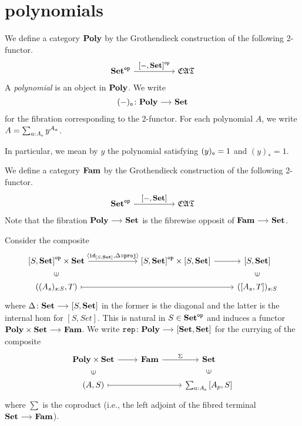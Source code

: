 \documentclass[a4paper,dvipsnames, 11pt]{amsart} %
\begin{document}
\section{polynomials}
\begin{definition}
	We define a category $\mathbf{Poly}$ by the Grothendieck construction of the following 2-functor.
	\[
		\Set^\op
		\arr"\left[-,\Set\right]^\op"[][5]
		\CATbi
	\]
	A \emph{polynomial} is an object in $\mathbf{Poly}$.
	We write
	\[
		(-)_\ob\colon\Poly\arr\Set
	\]
	for the fibration corresponding to the 2-functor.
	For each polynomial $A$,
	we write $A=\sum_{a: A_{\mathtt{o}}}y^{A_a}$.

	In particular, we mean by $y$ the polynomial satisfying
	$(y)_{\mathtt{o}}=1$ and $(y)_*=1$.
\end{definition}
\begin{definition}
	We define a category $\mathbf{Fam}$ by the Grothendieck construction of the following 2-functor.
	\[
		\Set^\op
		\arr"\left[-,\Set\right]"[][5]
		\CATbi
	\]
	Note that the fibration $\Poly\arr\Set$ is the fibrewise opposit of $\Fam\arr\Set$.
\end{definition}
\begin{definition}
	Consider the composite
	\[
		\begin{tikzcd}[row sep=5mm]
			\left[S,\Set\right]^\op\times\Set
			\ar[rr,"{\langle\id_{[S,\Set]},\Delta\circ\proj\rangle}"]
				&\ &
				\left[S,\Set\right]^\op\times\left[S,\Set\right]
				\ar[r]
					&
					\left[S,\Set\right]
			\\
			((A_s)_{s\tcolon S}, T)
			\ar[rrr,mapsto]
			\ar[u,"\in"marking,phantom]
				&\ &
					&
					(\left[A_s,T\right])_{s\tcolon S}
					\ar[u,"\in"marking,phantom]
		\end{tikzcd}
	\]
	where $\Delta\colon\Set\arr\left[S,\Set\right]$ in the former is the diagonal and
	the latter is the internal hom for $[S,Set]$.
	This is natural in $S\in\mathbf{Set}^{\mathtt{op}}$ and induces a functor
	$\Poly\times\Set\arr\Fam$.
	We write $\rep\colon\Poly\arr\left[\Set,\Set\right]$ for the currying of the composite
	\[
		\begin{tikzcd}[row sep=5mm]
			\Poly\times\Set
			\ar[r]
				&
				\Fam
				\ar[r,"\Sigma"]
					&
					\Set
			\\
			(A,S)
			\ar[rr,mapsto]
			\ar[u,"\in"marking,phantom]
				&
					&
					\sum_{a\tcolon A_\ob}\left[A_p,S\right]
					\ar[u,"\in"marking,phantom]
		\end{tikzcd}
	\]
	where $\sum$ is the coproduct (i.e., the left adjoint of the fibred terminal $\Set\arr\Fam$).
\end{definition}
\end{document}
